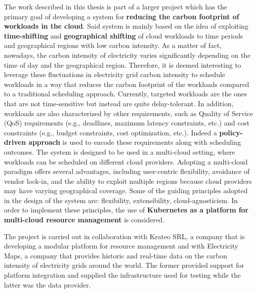 The work described in this thesis is part of a larger project which has the primary goal of developing a system for \textbf{reducing the carbon footprint of workloads in the cloud}.
Said system is mainly based on the idea of exploiting \textbf{time-shifting} and \textbf{geographical shifting} of cloud workloads to time periods and geographical regions with low carbon intensity.
As a matter of fact, nowadays, the carbon intensity of electricity varies significantly depending on the time of day and the geographical region.
Therefore, it is deemed interesting to leverage these fluctuations in electricity grid carbon intensity to schedule workloads in a way that reduces the carbon footprint of the workloads compared to a traditional scheduling approach.
Currently, targeted workloads are the ones that are not time-sensitive but instead are quite delay-tolerant.
In addition, workloads are also characterized by other requirements, such as Quality of Service (QoS) requirements (e.g., deadlines, maximum latency constraints, etc.) and cost constraints (e.g., budget constraints, cost optimization, etc.).
Indeed a \textbf{policy-driven approach} is used to encode these requirements along with scheduling outcomes.
The system is designed to be used in a multi-cloud setting, where workloads can be scheduled on different cloud providers.
Adopting a multi-cloud paradigm offers several advantages, including user-centric flexibility, avoidance of vendor lock-in, and the ability to exploit multiple regions because cloud providers may have varying geographical coverage.
Some of the guiding principles adopted in the design of the system are: flexibility, extensibility, cloud-agnosticism.
In order to implement these principles, the use of \textbf{Kubernetes as a platform for multi-cloud resource management} is considered. 

The project is carried out in collaboration with Krateo SRL, a company that is developing a modular platform for resource management and with Electricity Maps, a company that provides historic and real-time data on the carbon intensity of electricity grids around the world. 
The former provided support for platform integration and supplied the infrastructure used for testing while the latter was the data provider.
\newpage



